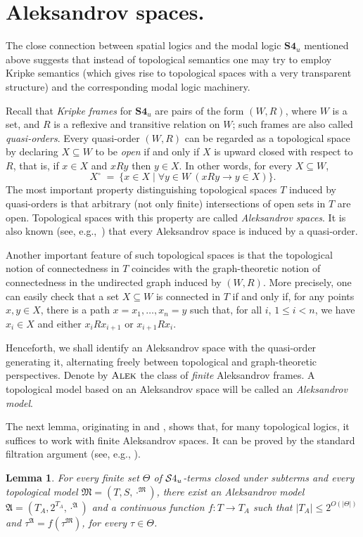 \documentclass{LMCS}
\theoremstyle{plain}
\newtheorem{lemma}[thm]{Lemma}
\newcommand{\ti}[2][]{#2^{\circ_{#1}}}
\newcommand{\AlekF}{\textsc{Alek}} \newcommand{\Con}{\textsc{Con}}
\newcommand{\Res}{{S}}\newcommand{\RegC}{\textsc{RC}}
\begin{document}
\section{Aleksandrov spaces.}
\label{sec:aleksandrov}

The close connection between spatial logics and the modal logic $\textbf{S4}_u$ mentioned above suggests that instead of topological semantics one may try to employ Kripke semantics (which gives rise to topological spaces with a very transparent structure) and the corresponding modal logic machinery.

Recall that \emph{Kripke frames} for $\textbf{S4}_u$ are pairs of the
form $(W,R)$, where $W$ is a set, and $R$ is a reflexive
and transitive relation on $W$; such frames are also called \emph{quasi-orders}.
Every quasi-order $(W,R)$ can be
regarded as a topological space by declaring $X \subseteq W$ to be
\emph{open} if and only if $X$ is upward closed with respect to $R$, that is,
if $x \in X$ and $xRy$ then $y \in X$. In other words, for every $X
\subseteq W$,
\begin{equation*}
\ti{X} ~=~ \bigl\{ x \in X \mid \forall y \in W\ (xRy \to y\in X) \bigr\}.
\end{equation*}
The most important property distinguishing topological spaces $T$ induced by quasi-orders is that arbitrary (not only finite) intersections of open sets in $T$ are open. Topological spaces with this property are called \emph{Aleksandrov spaces}. It is also known (see, e.g.,~\cite{Bourbaki66}) that every Aleksandrov space is induced by a
quasi-order.

Another important feature of such topological spaces is that the topological notion of connectedness in $T$ coincides with the graph-theoretic notion of connectedness in the undirected graph induced by $(W,R)$. More precisely, one can easily check that a set $X\subseteq W$ is connected in $T$ if and only if, for any points $x,y\in X$, there is a path $x= x_1, \dots, x_n = y$ such that, for all $i$, $1 \leq i < n$, we have $x_i \in X$ and either $x_iRx_{i+1}$ or $x_{i+1}Rx_i$.

Henceforth, we shall identify an Aleksandrov space with the
quasi-order generating it, alternating freely between topological and
graph-theoretic perspectives. Denote by $\AlekF$ the class of \emph{finite}
Aleksandrov frames.  A topological model
based on an Aleksandrov space will be called an \emph{Aleksandrov
model}.

The next lemma, originating in
\cite{McKinsey&Tarski44} and \cite{Kripke63}, shows that, for many
topological logics, it suffices to work with finite Aleksandrov
spaces. It can be proved by the standard filtration argument (see, e.g.,
\cite{Chagrov&Z97}).
\begin{lemma}\label{prop:KripkeSemantics}
For every finite set $\Theta$ of $\mathcal{S}4_u$-terms closed under subterms
and every topological model $\mathfrak{M} = (T,\Res,\cdot^{\mathfrak M})$,
there exist an Aleksandrov model $\mathfrak{A} = (T_A, 2^{T_A},
\cdot^{\mathfrak A})$ and a continuous function $f\colon T \to T_A$ such that $|T_A| \leq 2^{O(|\Theta|)}$ and $\tau^\mathfrak{A} = f(\tau^\mathfrak{M})$, for every $\tau\in \Theta$.
\end{lemma}
\end{document}
